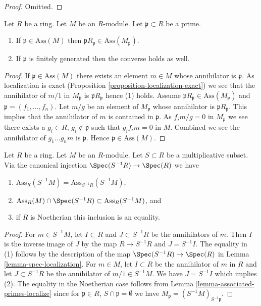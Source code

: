 \begin{proof}
Omitted.
\end{proof}

\begin{lemma}
\label{lemma-associated-primes-localize}
Let $R$ be a ring.
Let $M$ be an $R$-module.
Let $\mathfrak p \subset R$ be a prime.
\begin{enumerate}
\item If $\mathfrak p \in \text{Ass}(M)$ then
$\mathfrak pR_{\mathfrak p} \in \text{Ass}(M_{\mathfrak p})$.
\item If $\mathfrak p$ is finitely generated then the converse holds
as well.
\end{enumerate}
\end{lemma}

\begin{proof}
If $\mathfrak p \in \text{Ass}(M)$ there exists an element $m \in M$
whose annihilator is $\mathfrak p$. As localization is exact
(Proposition \ref{proposition-localization-exact})
we see that the annihilator of $m/1$ in
$M_{\mathfrak p}$ is $\mathfrak pR_{\mathfrak p}$ hence (1) holds.
Assume $\mathfrak pR_{\mathfrak p} \in \text{Ass}(M_{\mathfrak p})$
and $\mathfrak p = (f_1, \ldots, f_n)$. Let $m/g$ be an element of
$M_{\mathfrak p}$ whose annihilator is $\mathfrak pR_{\mathfrak p}$.
This implies that the annihilator of $m$ is contained in $\mathfrak p$.
As $f_i m/g = 0$ in $M_{\mathfrak p}$ we see there exists a
$g_i \in R$, $g_i \not \in \mathfrak p$ such that $g_i f_i m = 0$ in $M$.
Combined we see the annihilator of $g_1\ldots g_nm$ is $\mathfrak p$. Hence
$\mathfrak p \in \text{Ass}(M)$.
\end{proof}

\begin{lemma}
\label{lemma-localize-ass}
Let $R$ be a ring. Let $M$ be an $R$-module.
Let $S \subset R$ be a multiplicative subset.
Via the canonical injection $\Spec(S^{-1}R) \to \Spec(R)$
we have
\begin{enumerate}
\item $\text{Ass}_R(S^{-1}M) = \text{Ass}_{S^{-1}R}(S^{-1}M)$,
\item
$\text{Ass}_R(M) \cap \Spec(S^{-1}R) \subset \text{Ass}_R(S^{-1}M)$, and
\item if $R$ is Noetherian this inclusion is an equality.
\end{enumerate}
\end{lemma}

\begin{proof}
For $m \in S^{-1}M$, let $I \subset R$ and $J \subset S^{-1}R$ be the
annihilators of $m$. Then $I$ is the inverse image of $J$ by the map
$R \to S^{-1}R$ and $J = S^{-1}I$. The equality in (1) follows by the
description of the map $\Spec(S^{-1}R) \to \Spec(R)$ in
Lemma \ref{lemma-spec-localization}.
For $m \in M$, let $I \subset R$ be the annihilator of $m$ in $R$
and let $J \subset S^{-1}R$ be the annihilator of $m/1 \in S^{-1}M$.
We have $J = S^{-1}I$ which implies (2). The equality in the
Noetherian case follows from Lemma \ref{lemma-associated-primes-localize}
since for $\mathfrak p \in R$, $S \cap \mathfrak p = \emptyset$ we have
$M_{\mathfrak p} = (S^{-1}M)_{S^{-1}\mathfrak p}$.
\end{proof}

